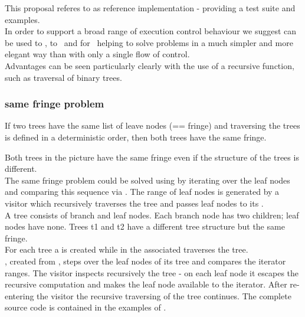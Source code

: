 
This proposal referes to \boostcoroutine as reference implementation - providing
a test suite and examples.\\
\newline
In order to support a broad range of execution control behaviour we suggest
\newline
\coro can be used to \escrecloops, to \escreccomps~and for \coopmultitasking~helping
to solve problems in a much simpler and more elegant way than with only a single
flow of control.\\
Advantages can be seen particularly clearly with the use of a recursive
function, such as traversal of binary trees.

\subsubsection*{same fringe problem}

If two trees have the same list of leave nodes (== fringe) and traversing the
trees is defined in a deterministic order, then both trees have the same fringe.\\


Both trees in the picture have the same fringe even if the structure of the trees
is different.\\
\newline
The same fringe problem could be solved using \coro by iterating over the leaf
nodes and comparing this sequence via . The range of leaf
nodes is generated by a visitor which recursively traverses the tree and passes
leaf nodes to its \coro.\\
\newline
{}
A tree consists of branch and leaf nodes. Each branch node has two children; leaf
nodes have none. Trees t1 and t2 have a different tree structure but the same fringe.\\
For each tree a \coro is created while in the associated \corofunction {}
traverses the tree.\\
\coroiterator, created from \coro, steps over the leaf nodes of its tree and
 compares the iterator ranges.
\newline
{}
The visitor inspects recursively the tree - on each leaf node it escapes the recursive
computation and makes the leaf node available to the iterator. After re-entering the
visitor the recursive traversing of the tree continues.
\newline
The complete source code is contained in the examples of \boostcoroutine.
